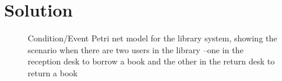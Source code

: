 \documentclass[11pt,letterpaper]{article}
\begin{document}
\section*{Solution}
\begin{figure}[!h]
	\centering
	\caption{Condition/Event Petri  net  model  for  the library  system, showing the scenario when there are two users in the library –one in the reception desk to borrow a book and the other in the return desk to return a book}
\end{figure}
\end{document}
